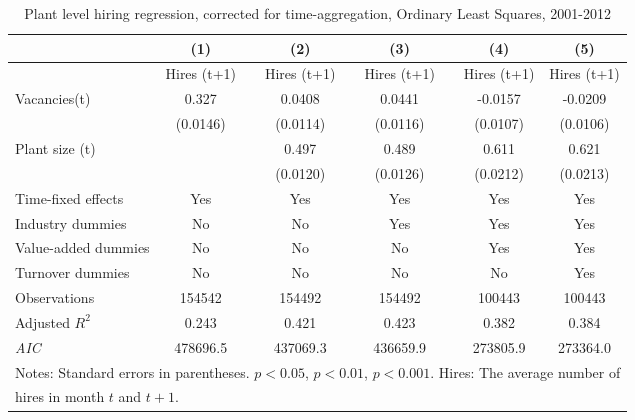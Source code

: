 \begin{table}[htbp]
\caption{\label{tab:robust_2m_avg} Plant level hiring regression, corrected for time-aggregation, Ordinary Least Squares,  2001-2012}
\begin{tabularx} {\textwidth} { l cXcXcXcc}
\hline
       &   (1) &&     (2) &&    (3)       &&   (4)        &   (5)      \\
\hline
        &   \footnotesize{ Hires (t+1)} &&     \footnotesize{ Hires (t+1)} &&    \footnotesize{ Hires (t+1)}      &&  \footnotesize{ Hires (t+1)}       &    \footnotesize{ Hires (t+1)}     \\
\hline
Vacancies(t) &      0.327\sym{***} &&      0.0408\sym{***} &&      0.0441\sym{***} &&     -0.0157         &     -0.0209\sym{**} \\        
                    &    (0.0146)         &&    (0.0114)         &&    (0.0116)         &&    (0.0107)         &    (0.0106)         \\
Plant size (t)      &                   &&     0.497\sym{***}  &&       0.489\sym{***} &&       0.611\sym{***} &       0.621\sym{***} \\
                    &                   && (0.0120)         &&    (0.0126)         &&    (0.0212)         &    (0.0213)             \\
\hline
\footnotesize{Time-fixed effects}  & Yes                 && Yes                     &&           Yes          &&    Yes        &    Yes      \\
\footnotesize{Industry dummies}   & No                  && No                      &&     Yes                 &&    Yes        &   Yes      \\
\footnotesize{Value-added dummies} & No                  && No                      &&     No                 &&    Yes        &    Yes      \\
\footnotesize{Turnover dummies }   & No                  && No                      &&     No                 &&    No        &    Yes      \\
\hline
Observations        &   154542         &&      154492         &&      154492         &&      100443         &     100443        \\
Adjusted \(R^{2}\)  &     0.243         &&       0.421         &&       0.423         &&       0.382         &       0.384       \\
\textit{AIC}        &  478696.5         &&    437069.3         &&    436659.9         &&    273805.9         &    273364.0             \\
\hline\hline
\multicolumn{9}{l}{\footnotesize Notes: Standard errors in parentheses. \sym{*} \(p<0.05\), \sym{**} \(p<0.01\), \sym{***} \(p<0.001\). Hires: The average number of   }\\
\multicolumn{9}{l}{\footnotesize hires in month $t$ and $t+1$. }\\
\end{tabularx}
\end{table}




